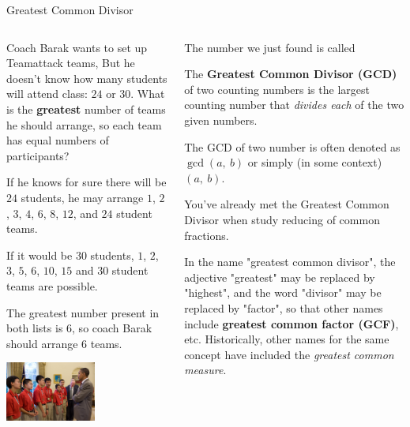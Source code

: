 \documentclass[9pt,aspectratio=169]{beamer}
\begin{document}
\begin{frame}{Greatest Common Divisor}
  \begin{columns}[T]
    \begin{column}{0.5\textwidth}
      \begin{problem}
        Coach Barak wants to set up Teamattack teams, But he doesn't know how many students will attend class: $24$ or $30$. What is the \textbf{greatest} number of teams he should arrange, so each team has equal numbers of participants?
      \end{problem}
      If he knows for sure there will be $24$ students, he may arrange $1$, $2$, $3$, $4$, $6$, $8$, $12$, and $24$ student teams.
      
      If it would be $30$ students, $1$, $2$, $3$, $5$, $6$, $10$, $15$ and $30$ student teams are possible.
      
      The greatest number present in both lists is $6$, so coach Barak should arrange $6$ teams.
      \begin{center}
        \includegraphics[width=0.55\textwidth]{04 - Number Theory 101/barak.jpg}
      \end{center}
    \end{column}
    \begin{column}{0.5\textwidth}
      The number we just found is called
      \begin{definition}
        The \textbf{Greatest Common Divisor (GCD)} of two counting numbers is the largest counting number that \emph{divides each} of the two given numbers.
      \end{definition}
      
      The GCD of two number is often denoted as $\gcd(a,\ b)$ or simply (in some context) $(a,\ b)$.\medskip

      You've already met the Greatest Common Divisor when study reducing of common fractions.\medskip 

      In the name "greatest common divisor", the adjective "greatest" may be replaced by "highest", and the word "divisor" may be replaced by "factor", so that other names include \textbf{greatest common factor (GCF)}, etc. Historically, other names for the same concept have included the \emph{greatest common measure}.
    \end{column}
  \end{columns}
\end{frame}
\end{document}
